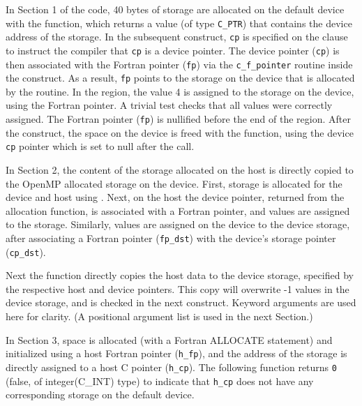 In Section 1 of the code, 40 bytes of storage are allocated on the default device
with the  function, which returns a value (of type
\texttt{C\_PTR}) that contains the device address of the storage.
In the subsequent  construct, \texttt{cp} is specified on the
 clause to instruct the compiler that \texttt{cp} is
a device pointer.
The device pointer (\texttt{cp}) is then associated with the Fortran pointer
(\texttt{fp}) via the \texttt{c\_f\_pointer} routine inside the 
construct.
As a result, \texttt{fp} points to the storage on the device that is allocated
by the  routine.
In the  region, the value 4 is assigned to the storage on the device,
using the Fortran pointer.
A trivial test checks that all values were correctly assigned.
The Fortran pointer (\texttt{fp}) is nullified before the end of the  region.
After the  construct, the space on the device is freed with the
 function, using the device \texttt{cp} pointer
which is set to null after the call.

In Section 2, the content of the storage allocated on the host is directly copied
to the OpenMP allocated storage on the device.
First, storage is allocated for the device and host using .
Next, on the host the device pointer, returned from the allocation
 function, is associated with a Fortran pointer, and
values are assigned to the storage. Similarly, values are assigned on the device
to the device storage, after associating a Fortran pointer (\texttt{fp\_dst})
with the device's storage pointer (\texttt{cp\_dst}).

Next the  function directly copies the host data
to the device storage, specified by the respective host and device pointers.
This copy will overwrite -1 values in the device storage, and is checked in the
next  construct.
Keyword arguments are used here for clarity.
(A positional argument list is used in the next Section.)

In Section 3, space is allocated (with a Fortran ALLOCATE statement) and initialized using a
host Fortran pointer (\texttt{h\_fp}), and the address of the storage is directly assigned to a
host C pointer (\texttt{h\_cp}).
The following  function returns \texttt{0} (false, of integer(C\_INT) type)
to indicate that \texttt{h\_cp} does not have any corresponding storage on the default device.

